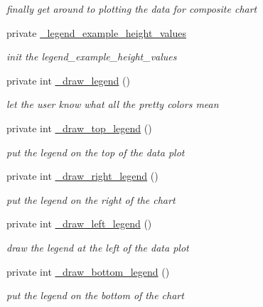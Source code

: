 \begin{DoxyCompactItemize}
\begin{DoxyCompactList}\small\item\em finally get around to plotting the data for composite chart \item\end{DoxyCompactList}\item 
private \hyperlink{classChart_1_1Composite_aa088e48fc82810b46bde41f468897335}{\_\-legend\_\-example\_\-height\_\-values}
\begin{DoxyCompactList}\small\item\em init the legend\_\-example\_\-height\_\-values \item\end{DoxyCompactList}\item 
private int \hyperlink{classChart_1_1Composite_afcfacbb3cf9fde5a3d9debd6daca3291}{\_\-draw\_\-legend} ()
\begin{DoxyCompactList}\small\item\em let the user know what all the pretty colors mean \item\end{DoxyCompactList}\item 
private int \hyperlink{classChart_1_1Composite_a844a6a68ef755e13236e013decf9cddf}{\_\-draw\_\-top\_\-legend} ()
\begin{DoxyCompactList}\small\item\em put the legend on the top of the data plot \item\end{DoxyCompactList}\item 
private int \hyperlink{classChart_1_1Composite_ae2376bb07ec85374f24b76ac0dbc813a}{\_\-draw\_\-right\_\-legend} ()
\begin{DoxyCompactList}\small\item\em put the legend on the right of the chart \item\end{DoxyCompactList}\item 
private int \hyperlink{classChart_1_1Composite_aaf2a13312cf3fda279eb6b7e37188027}{\_\-draw\_\-left\_\-legend} ()
\begin{DoxyCompactList}\small\item\em draw the legend at the left of the data plot \item\end{DoxyCompactList}\item 
private int \hyperlink{classChart_1_1Composite_a91f9c46886e61ae81057a7489632f366}{\_\-draw\_\-bottom\_\-legend} ()
\begin{DoxyCompactList}\small\item\em put the legend on the bottom of the chart \item\end{DoxyCompactList}\item 

\end{DoxyCompactItemize}
